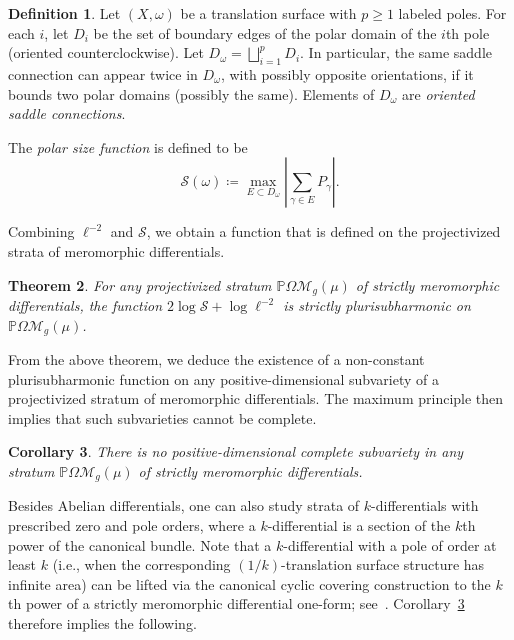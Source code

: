 \documentclass[11]{amsart}
\theoremstyle{plain}
\newtheorem{theorem}{Theorem}[section]
\newtheorem{corollary}[theorem]{Corollary}
\theoremstyle{definition}
\newtheorem{definition}[theorem]{Definition}
\begin{document}
\begin{definition}\label{defn:PSF}
Let $(X,\omega)$ be a translation surface with $p \geq 1$ labeled poles. For each $i$, let $D_{i}$ be the set of boundary edges of the polar domain of the $i$th pole (oriented counterclockwise). Let $D_{\omega} = \bigsqcup\limits_{i=1}^{p} D_{i}$. In particular, the same saddle connection can appear twice in $D_{\omega}$, with possibly opposite orientations, if it bounds two polar domains (possibly the same). Elements of $D_{\omega}$ are \textit{oriented saddle connections}.
\par
The \textit{polar size function} is defined to be
$$
\mathcal{S}(\omega)\coloneqq \max\limits_{E \subset D_{\omega}} \left|\sum\limits_{\gamma \in E} P_{\gamma} \right|.
$$
\end{definition}

Combining $\ell^{-2}$ and $\mathcal{S}$, we obtain a function that is defined on the projectivized strata of meromorphic differentials. 

\begin{theorem}\label{theorem:MAIN}
For any projectivized stratum $\mathbb{P}\Omega\mathcal M_g(\mu)$ of strictly meromorphic differentials, the function $2\log \mathcal{S} + \log \ell^{-2}$ is strictly plurisubharmonic on $\mathbb{P}\Omega\mathcal M_g(\mu)$. 
\end{theorem}

From the above theorem, we deduce the existence of a non-constant plurisubharmonic function on any positive-dimensional subvariety of a projectivized stratum of meromorphic differentials. The maximum principle then implies that such subvarieties cannot be complete. 

\begin{corollary}\label{cor:NoPositive}
There is no positive-dimensional complete subvariety in any stratum $\mathbb{P}\Omega\mathcal M_g(\mu)$ of strictly meromorphic differentials. 
\end{corollary}

Besides Abelian differentials, one can also study strata of $k$-differentials with prescribed zero and pole orders, where a $k$-differential is a section of the $k$th power of the canonical bundle. Note that a $k$-differential with a pole of order at least $k$ (i.e., when the corresponding $(1/k)$-translation surface structure has infinite area) can be lifted via the canonical cyclic covering construction to the $k$th power of a strictly meromorphic differential one-form; see~\cite[Section 2]{BCGGM-k}. Corollary~\ref{cor:NoPositive} therefore implies the following.  
\end{document}
